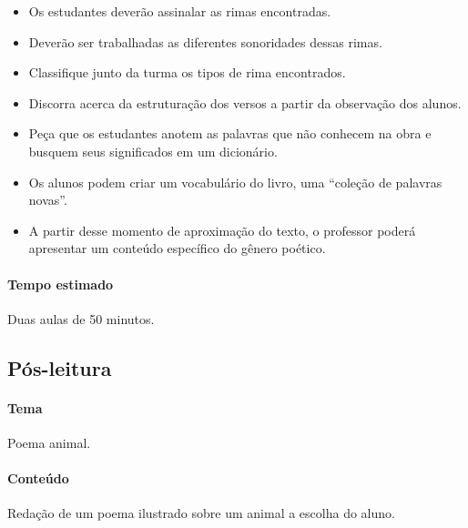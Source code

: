 \documentclass[11pt]{extarticle}
\begin{document}
\begin{itemize}

\item Os estudantes deverão assinalar as rimas encontradas.

\item Deverão ser trabalhadas as diferentes sonoridades dessas rimas.

\item Classifique junto da turma os tipos de rima encontrados.

\item Discorra acerca da estruturação dos versos a partir da observação dos alunos.

\item Peça que os estudantes anotem as palavras que não conhecem na obra e busquem seus significados em um dicionário. 

\item Os alunos podem criar um vocabulário do livro, uma ``coleção de palavras novas''. 

\item A partir desse momento de aproximação do texto, o professor poderá apresentar um conteúdo específico do gênero poético. 

\end{itemize}

\paragraph{Tempo estimado} Duas aulas de 50 minutos.


\subsection{Pós-leitura}


\paragraph{Tema} Poema animal.

\paragraph{Conteúdo} Redação de um poema ilustrado sobre um animal a escolha do aluno.
\end{document}
